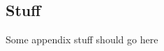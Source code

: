 \begin{appendices}
\section{Stuff} %
\label{sec:stuff}
Some appendix stuff should go here
\end{appendices}
